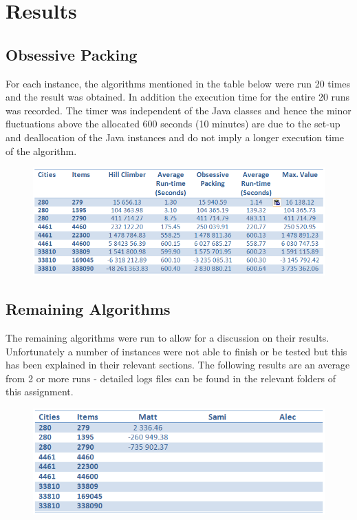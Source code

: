 \documentclass[a4paper,12pt]{article}
\begin{document}
\newpage
\section{Results}
\subsection{Obsessive Packing}
For each instance, the algorithms mentioned in the table below were run 20 times and the result was obtained. In addition the execution time for the entire 20 runs was recorded. The timer was independent of the Java classes and hence the minor fluctuations above the allocated 600 seconds (10 minutes) are due to the set-up and deallocation of the Java instances and do not imply a longer execution time of the algorithm.
\begin{figure}[h]
\centering
\includegraphics[width=\linewidth]{ResultsTable.png}
\end{figure}

\subsection{Remaining Algorithms}
The remaining algorithms were run to allow for a discussion on their results. Unfortunately a number of instances were not able to finish or be tested but this has been explained in their relevant sections. The following results are an average from 2 or more runs - detailed logs files can be found in the relevant folders of this assignment.

\begin{figure}[h]
\centering
\includegraphics[width=14cm]{AlgorithmResults.png}
\end{figure}
\end{document}
